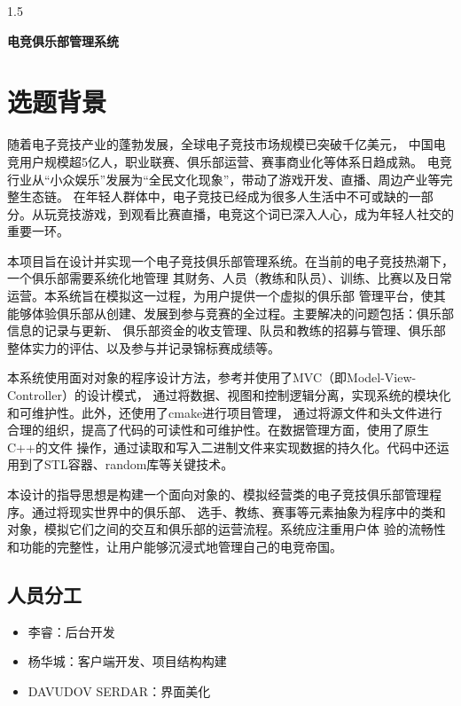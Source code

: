 \documentclass[a4paper]{article}
\begin{document}




\begin{spacing}{1.5}
\setcounter{page}{1}

\begin{center}
{ \bfseries 电竞俱乐部管理系统}
\end{center}

    \section{选题背景}

    随着电子竞技产业的蓬勃发展，全球电子竞技市场规模已突破千亿美元，
中国电竞用户规模超5亿人，职业联赛、俱乐部运营、赛事商业化等体系日趋成熟。
电竞行业从“小众娱乐”发展为“全民文化现象”，带动了游戏开发、直播、周边产业等完整生态链。
在年轻人群体中，电子竞技已经成为很多人生活中不可或缺的一部分。从玩竞技游戏，到观看比赛直播，电竞这个词已深入人心，成为年轻人社交的重要一环。

    本项目旨在设计并实现一个电子竞技俱乐部管理系统。在当前的电子竞技热潮下，一个俱乐部需要系统化地管理
    其财务、人员（教练和队员）、训练、比赛以及日常运营。本系统旨在模拟这一过程，为用户提供一个虚拟的俱乐部
    管理平台，使其能够体验俱乐部从创建、发展到参与竞赛的全过程。主要解决的问题包括：俱乐部信息的记录与更新、
    俱乐部资金的收支管理、队员和教练的招募与管理、俱乐部整体实力的评估、以及参与并记录锦标赛成绩等。

    本系统使用面对对象的程序设计方法，参考并使用了MVC（即Model-View-Controller）的设计模式，
    通过将数据、视图和控制逻辑分离，实现系统的模块化和可维护性。此外，还使用了cmake进行项目管理，
    通过将源文件和头文件进行合理的组织，提高了代码的可读性和可维护性。在数据管理方面，使用了原生C++的文件
    操作，通过读取和写入二进制文件来实现数据的持久化。代码中还运用到了STL容器、random库等关键技术。

    本设计的指导思想是构建一个面向对象的、模拟经营类的电子竞技俱乐部管理程序。通过将现实世界中的俱乐部、
    选手、教练、赛事等元素抽象为程序中的类和对象，模拟它们之间的交互和俱乐部的运营流程。系统应注重用户体
    验的流畅性和功能的完整性，让用户能够沉浸式地管理自己的电竞帝国。

    \subsection{人员分工}
        \begin{itemize}
            \item 李睿：后台开发
            \item 杨华城：客户端开发、项目结构构建
            \item DAVUDOV SERDAR：界面美化
        \end{itemize}



\end{spacing}
\end{document}
